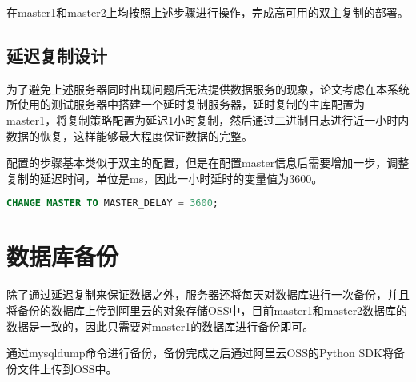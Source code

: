 在master1和master2上均按照上述步骤进行操作，完成高可用的双主复制的部署。
\subsection{延迟复制设计}
为了避免上述服务器同时出现问题后无法提供数据服务的现象，论文考虑在本系统所使用的测试服务器中搭建一个延时复制服务器，延时复制的主库配置为master1，将复制策略配置为延迟1小时复制，然后通过二进制日志进行近一小时内数据的恢复，这样能够最大程度保证数据的完整。

配置的步骤基本类似于双主的配置，但是在配置master信息后需要增加一步，调整复制的延迟时间，单位是ms，因此一小时延时的变量值为3600。

\begin{lstlisting}[language=sql,numbers=none]
CHANGE MASTER TO MASTER_DELAY = 3600;
\end{lstlisting}

\section{数据库备份}
除了通过延迟复制来保证数据之外，服务器还将每天对数据库进行一次备份，并且将备份的数据库上传到阿里云的对象存储OSS中，目前master1和master2数据库的数据是一致的，因此只需要对master1的数据库进行备份即可。

通过mysqldump命令进行备份，备份完成之后通过阿里云OSS的Python SDK将备份文件上传到OSS中。

